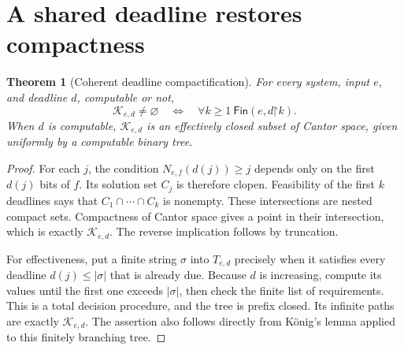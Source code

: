 \documentclass[11pt,letterpaper]{article}
\newtheorem{theorem}{Theorem}[section]
\theoremstyle{definition}
\theoremstyle{remark}
\newcommand{\Fin}{\mathsf{Fin}}
\newcommand{\pref}{\mathord{\upharpoonright}}
\newcommand{\cK}{\mathcal K}
\newcommand{\1}{\mathbf 1}
\begin{document}
\section{A shared deadline restores compactness}\label{lbh:sec:compact}\label{lbh:qd:sec:deadlines}\label{lbh:ql:sec:deadlines}

\begin{theorem}[Coherent deadline compactification]\label{lbh:thm:compact}\label{lbh:qd:thm:deadline}\label{lbh:ql:thm:deadlinecompact}
For every system, input $e$, and deadline $d$, computable or not,
\begin{equation}\label{lbh:eq:compact-equivalence}
 \cK_{e,d}\ne\varnothing
 \quad\Longleftrightarrow\quad
 \forall k\ge1\ \Fin(e,d\pref k).
\end{equation}
When $d$ is computable, $\cK_{e,d}$ is an effectively closed subset of Cantor
space, given uniformly by a computable binary tree.
\end{theorem}
\begin{proof}
For each $j$, the condition $N_{e,f}(d(j))\ge j$ depends only on the first
$d(j)$ bits of $f$. Its solution set $C_j$ is therefore clopen. Feasibility
of the first $k$ deadlines says that
$C_1\cap\cdots\cap C_k$ is nonempty. These intersections are nested compact
sets. Compactness of Cantor space gives a point in their intersection,
which is exactly $\cK_{e,d}$. The reverse implication follows by truncation.

For effectiveness, put a finite string $\sigma$ into $T_{e,d}$ precisely
when it satisfies every deadline $d(j)\le|\sigma|$ that is already due.
Because $d$ is increasing, compute its values until the first one exceeds
$|\sigma|$, then check the finite list of requirements. This is a total
decision procedure, and the tree is prefix closed. Its infinite paths are
exactly $\cK_{e,d}$. The assertion also follows directly from K\"onig's
lemma applied to this finitely branching tree.
\end{proof}
\end{document}
